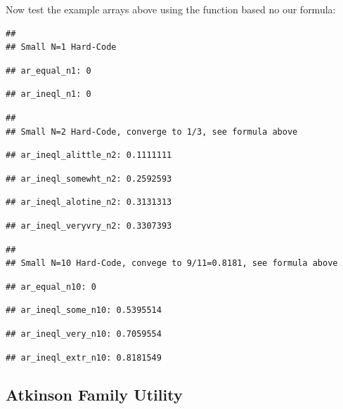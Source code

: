 \documentclass[
]{book}
\begin{document}
Now test the example arrays above using the function based no our formula:

\begin{verbatim}
## 
## Small N=1 Hard-Code
\end{verbatim}

\begin{verbatim}
## ar_equal_n1: 0
\end{verbatim}

\begin{verbatim}
## ar_ineql_n1: 0
\end{verbatim}

\begin{verbatim}
## 
## Small N=2 Hard-Code, converge to 1/3, see formula above
\end{verbatim}

\begin{verbatim}
## ar_ineql_alittle_n2: 0.1111111
\end{verbatim}

\begin{verbatim}
## ar_ineql_somewht_n2: 0.2592593
\end{verbatim}

\begin{verbatim}
## ar_ineql_alotine_n2: 0.3131313
\end{verbatim}

\begin{verbatim}
## ar_ineql_veryvry_n2: 0.3307393
\end{verbatim}

\begin{verbatim}
## 
## Small N=10 Hard-Code, convege to 9/11=0.8181, see formula above
\end{verbatim}

\begin{verbatim}
## ar_equal_n10: 0
\end{verbatim}

\begin{verbatim}
## ar_ineql_some_n10: 0.5395514
\end{verbatim}

\begin{verbatim}
## ar_ineql_very_n10: 0.7059554
\end{verbatim}

\begin{verbatim}
## ar_ineql_extr_n10: 0.8181549
\end{verbatim}

\hypertarget{atkinson-family-utility}{%
\subsection{Atkinson Family Utility}\label{atkinson-family-utility}}
\end{document}
